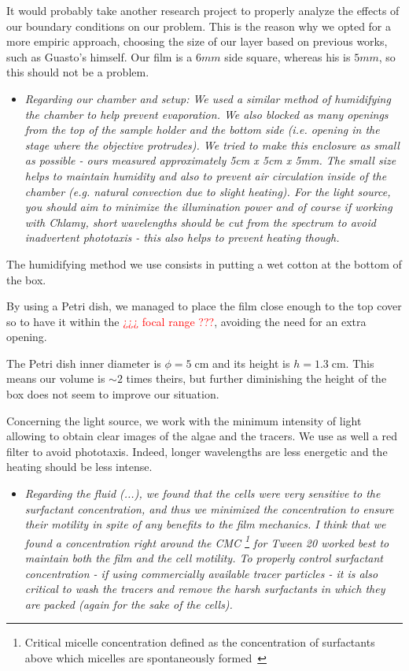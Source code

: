 It would probably take another research project to properly analyze the effects of our boundary conditions on our problem. This is the reason why we opted for a more empiric approach, choosing the size of our layer based on previous works, such as Guasto's himself. Our film is a $6mm$ side square, whereas his is $5mm$, so this should not be a problem.

\begin{itemize}
	\item \textit{Regarding our chamber and setup: We used a similar method of humidifying the chamber to help prevent evaporation. We also blocked as many openings from the top of the sample holder and the bottom side (i.e. opening in the stage where the objective protrudes). We tried to make this enclosure as small as possible - ours measured approximately 5cm x 5cm x 5mm. The small size helps to maintain humidity and also to prevent air circulation inside of the chamber (e.g. natural convection due to slight heating). For the light source, you should aim to minimize the illumination power and of course if working with Chlamy, short wavelengths should be cut from the spectrum to avoid inadvertent phototaxis - this also helps to prevent heating though.}
\end{itemize}

The humidifying method we use consists in putting a wet cotton at the bottom of the box. 

By using a Petri dish, we managed to place the film close enough to the top cover so to have it within the \textcolor{red}{¿¿¿ focal range ???}, avoiding the need for an extra opening. 

The Petri dish inner diameter is $\phi = 5 \; \textrm{cm}$ and its height is $h = 1.3 \; \textrm{cm}$. This means our volume is $\sim 2$ times theirs, but further diminishing the height of the box does not seem to improve our situation.

Concerning the light source, we work with the minimum intensity of light allowing to obtain clear images of the algae and the tracers. We use as well a red filter to avoid phototaxis. Indeed, longer wavelengths are less energetic and the heating should be less intense. 

\begin{itemize}
	\item \textit{Regarding the fluid (...), we found that the cells were very sensitive to the surfactant concentration, and thus we minimized the concentration to ensure their motility in spite of any benefits to the film mechanics. I think that we found a concentration right around the CMC \footnote{Critical micelle concentration defined as the concentration of surfactants above which micelles are spontaneously formed~\cite{Sheng2011}} for Tween 20 worked best to maintain both the film and the cell motility. To properly control surfactant concentration - if using commercially available tracer particles - it is also critical to wash the tracers and remove the harsh surfactants in which they are packed (again for the sake of the cells).}
\end{itemize}

